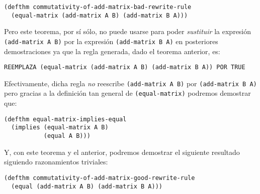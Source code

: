 \documentclass[a4paper,10pt]{article}
\begin{document}
\par \vspace{10pt}	

\begin{lstlisting}[language=clips]
(defthm commutativity-of-add-matrix-bad-rewrite-rule
  (equal-matrix (add-matrix A B) (add-matrix B A)))
\end{lstlisting}

\par \vspace{10pt}		

Pero este teorema, por sí sólo, no puede usarse para poder \emph{sustituir} la expresión \texttt{(add-matrix A B)} por la expresión \texttt{(add-matrix B A)} en posteriores demostraciones ya que la regla generada, dado el teorema anterior, es:

\par \vspace{10pt}		

\begin{center}
\texttt{REEMPLAZA (equal-matrix (add-matrix A B) (add-matrix B A)) POR TRUE}
\end{center}

\par \vspace{10pt}		

Efectivamente, dicha regla \emph{no} reescribe \texttt{(add-matrix A B)} por \texttt{(add-matrix B A)} pero gracias a la definición tan general de \texttt{(equal-matrix)} podremos demostrar que:

\par \vspace{10pt}	

\begin{lstlisting}[language=clips]
(defthm equal-matrix-implies-equal
  (implies (equal-matrix A B)
           (equal A B)))
\end{lstlisting}

\par \vspace{10pt}		

Y, con este teorema y el anterior, podremos demostrar el siguiente resultado siguiendo razonamientos triviales:

\par \vspace{10pt}		

\begin{lstlisting}[language=clips]
(defthm commutativity-of-add-matrix-good-rewrite-rule
  (equal (add-matrix A B) (add-matrix B A)))
\end{lstlisting}
\end{document}
